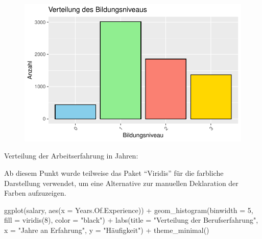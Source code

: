 \documentclass[
  letterpaper,
  DIV=11,
  numbers=noendperiod]{scrartcl}
\newenvironment{Shaded}{\begin{snugshade}}{\end{snugshade}}
\newcommand{\AttributeTok}[1]{\textcolor[rgb]{0.40,0.45,0.13}{#1}}
\newcommand{\DecValTok}[1]{\textcolor[rgb]{0.68,0.00,0.00}{#1}}
\newcommand{\FunctionTok}[1]{\textcolor[rgb]{0.28,0.35,0.67}{#1}}
\newcommand{\NormalTok}[1]{\textcolor[rgb]{0.00,0.23,0.31}{#1}}
\newcommand{\SpecialCharTok}[1]{\textcolor[rgb]{0.37,0.37,0.37}{#1}}
\newcommand{\StringTok}[1]{\textcolor[rgb]{0.13,0.47,0.30}{#1}}
\begin{document}
\begin{figure}[H]

{\centering \includegraphics{main_doc_files/figure-pdf/unnamed-chunk-9-1.pdf}

}

\end{figure}

Verteilung der Arbeitserfahrung in Jahren:

Ab diesem Punkt wurde teilweise das Paket ``Viridis'' für die farbliche
Darstellung verwendet, um eine Alternative zur manuellen Deklaration der
Farben aufzuzeigen.

\begin{Shaded}
\begin{Highlighting}[]
\FunctionTok{ggplot}\NormalTok{(salary, }\FunctionTok{aes}\NormalTok{(}\AttributeTok{x =} \StringTok{\textasciigrave{}}\AttributeTok{Years.Of.Experience}\StringTok{\textasciigrave{}}\NormalTok{)) }\SpecialCharTok{+}
  \FunctionTok{geom\_histogram}\NormalTok{(}\AttributeTok{binwidth =} \DecValTok{5}\NormalTok{, }\AttributeTok{fill =} \FunctionTok{viridis}\NormalTok{(}\DecValTok{8}\NormalTok{), }\AttributeTok{color =} \StringTok{"black"}\NormalTok{) }\SpecialCharTok{+}
  \FunctionTok{labs}\NormalTok{(}\AttributeTok{title =} \StringTok{"Verteilung der Berufserfahrung"}\NormalTok{,}
       \AttributeTok{x =} \StringTok{"Jahre an Erfahrung"}\NormalTok{,}
       \AttributeTok{y =} \StringTok{"Häufigkeit"}\NormalTok{) }\SpecialCharTok{+}
  \FunctionTok{theme\_minimal}\NormalTok{()}
\end{Highlighting}
\end{Shaded}
\end{document}
